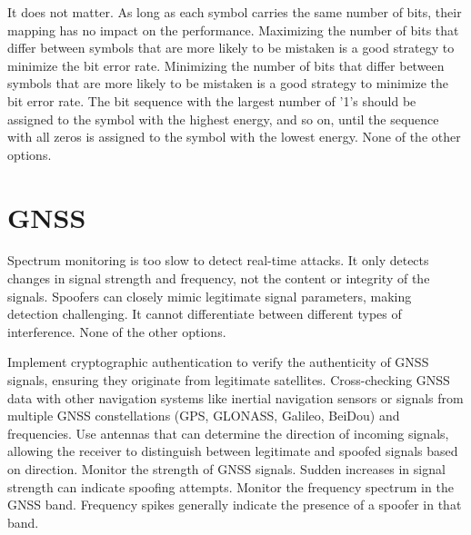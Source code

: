 \begin{questions}
    \begin{checkboxes}
        \choice It does not matter. As long as each symbol carries the same number of bits, their mapping has no impact on the performance.
        \choice Maximizing the number of bits that differ between symbols that are more likely to be mistaken is a good strategy to minimize the bit error rate.
        \CorrectChoice Minimizing the number of bits that differ between symbols that are more likely to be mistaken is a good strategy to minimize the bit error rate.
        \choice The bit sequence with the largest number of '1's should be assigned to the symbol with the highest energy, and so on, until the sequence with all zeros is assigned to the symbol with the lowest energy.
        \choice None of the other options.
    \end{checkboxes}

    \section{GNSS}


    \begin{checkboxes}
        \choice Spectrum monitoring is too slow to detect real-time attacks.
        \CorrectChoice It only detects changes in signal strength and frequency, not the content or integrity of the signals.
        \CorrectChoice Spoofers can closely mimic legitimate signal parameters, making detection challenging.
        \choice It cannot differentiate between different types of interference.
        \choice None of the other options.
    \end{checkboxes}


    \begin{checkboxes}
        \choice Implement cryptographic authentication to verify the authenticity of GNSS signals, ensuring they originate from legitimate satellites.
        \choice Cross-checking GNSS data with other navigation systems like inertial navigation sensors or signals from multiple GNSS constellations (GPS, GLONASS, Galileo, BeiDou) and frequencies.
        \choice Use antennas that can determine the direction of incoming signals, allowing the receiver to distinguish between legitimate and spoofed signals based on direction.
        \choice Monitor the strength of GNSS signals. Sudden increases in signal strength can indicate spoofing attempts.
        \CorrectChoice Monitor the frequency spectrum in the GNSS band. Frequency spikes generally indicate the presence of a spoofer in that band.
    \end{checkboxes}



\end{questions}
